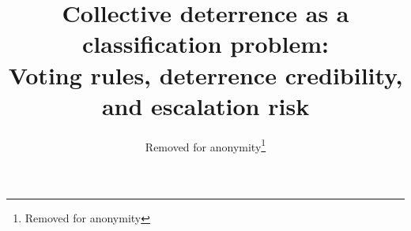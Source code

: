 \documentclass[11pt, twocolumn]{article}
\author{Removed for anonymity\thanks{Removed for anonymity}}
\title{Collective deterrence as a classification problem: \\
Voting rules, deterrence credibility, and escalation risk}
\date{}
\begin{document}
\maketitle 
 






\printbibliography{}  
\end{document}
